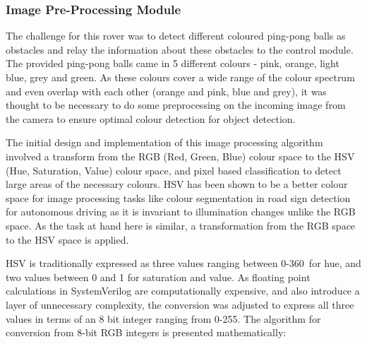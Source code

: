 \documentclass[a4paper]{article}
\begin{document}
\subsubsection{Image Pre-Processing Module}

The challenge for this rover was to detect different coloured ping-pong balls as
obstacles and relay the information about these obstacles to the control module. 
The provided ping-pong balls came in 5 different colours - pink, orange, light 
blue, grey and green. As these colours cover a wide range of the colour spectrum
and even overlap with each other (orange and pink, blue and grey), it was thought 
to be necessary to do some preprocessing on the incoming image from the camera 
to ensure optimal colour detection for object detection.  
 


The initial design and implementation of this image processing algorithm involved
a transform from the RGB (Red, Green, Blue) colour space to the HSV (Hue, 
Saturation, Value) colour space, and pixel based classification to detect large
areas of the necessary colours.  HSV has been shown to be a better colour space
for image processing tasks like colour segmentation in road sign detection for 
autonomous driving as it is invariant to illumination changes unlike the RGB 
space.\cite{ali2013performance} As the task at hand here is similar, a transformation
from the RGB space to the HSV space is applied. 

HSV is traditionally expressed as three values ranging between 0-360\degree\  
for hue, and two values between 0 and 1 for saturation and value.\cite{10.1145/965139.807361}
As floating point calculations in SystemVerilog are computationally expensive, 
and also introduce a layer of unnecessary complexity, the conversion was adjusted
to express all three values in terms of an 8 bit integer ranging from 0-255. The
algorithm for conversion from 8-bit RGB integers is presented mathematically:
\end{document}
